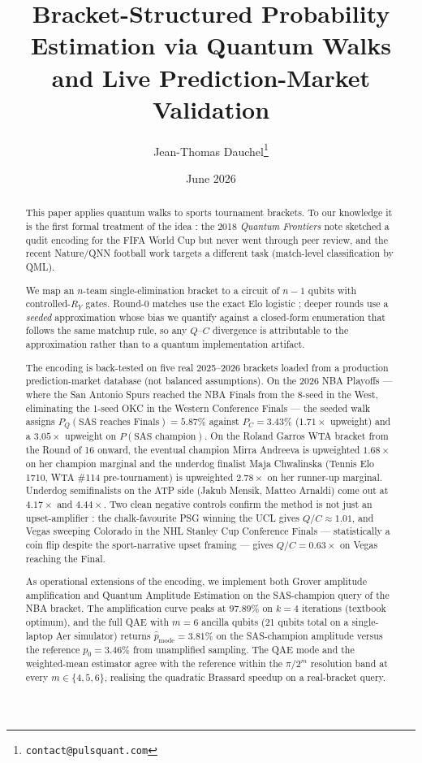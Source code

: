 \documentclass[11pt]{article}
\title{Bracket-Structured Probability Estimation via Quantum Walks\\
and Live Prediction-Market Validation}
\author{Jean-Thomas Dauchel\thanks{\texttt{contact@pulsquant.com}}}
\affil{PulsQuant --- Independent Research}
\date{June 2026}
\begin{document}
\maketitle

\begin{abstract}
This paper applies quantum walks to sports tournament brackets. To
our knowledge it is the first formal treatment of the idea : the 2018
\emph{Quantum Frontiers} note \cite{quantumfrontiers_wc_2018} sketched
a qudit encoding for the FIFA World Cup but never went through peer
review, and the recent Nature/QNN football work
\cite{nature_qnn_football_2025} targets a different task (match-level
classification by QML).

We map an $n$-team single-elimination bracket to a circuit of $n{-}1$
qubits with controlled-$R_Y$ gates. Round-0 matches use the exact
Elo logistic ; deeper rounds use a \emph{seeded} approximation whose
bias we quantify against a closed-form enumeration that follows the
same matchup rule, so any $Q$--$C$ divergence is attributable to the
approximation rather than to a quantum implementation artifact.

The encoding is back-tested on five real 2025--2026 brackets loaded
from a production prediction-market database (not balanced
assumptions). On the 2026 NBA Playoffs --- where the San Antonio
Spurs reached the NBA Finals from the 8-seed in the West, eliminating
the 1-seed OKC in the Western Conference Finals --- the seeded walk
assigns $P_Q(\text{SAS reaches Finals}) = 5.87\%$ against $P_C =
3.43\%$ ($\mathbf{1.71\times}$ upweight) and a $\mathbf{3.05\times}$
upweight on $P(\text{SAS champion})$. On the Roland Garros WTA bracket
from the Round of 16 onward, the eventual champion Mirra Andreeva is
upweighted $\mathbf{1.68\times}$ on her champion marginal and the
underdog finalist Maja Chwalinska (Tennis Elo 1710, WTA \#114
pre-tournament) is upweighted $\mathbf{2.78\times}$ on her
runner-up marginal. Underdog semifinalists on the ATP side (Jakub
Mensik, Matteo Arnaldi) come out at $\mathbf{4.17\times}$ and
$\mathbf{4.44\times}$. Two clean negative controls confirm the
method is not just an upset-amplifier : the chalk-favourite PSG
winning the UCL gives $Q/C \approx 1.01$, and Vegas sweeping Colorado
in the NHL Stanley Cup Conference Finals --- statistically a coin
flip despite the sport-narrative upset framing --- gives $Q/C =
0.63\times$ on Vegas reaching the Final.

As operational extensions of the encoding, we implement both Grover
amplitude amplification and Quantum Amplitude Estimation
\cite{brassard2002quantum} on the SAS-champion query of the NBA
bracket. The amplification curve peaks at $97.89\%$ on $k = 4$
iterations (textbook optimum), and the full QAE with $m = 6$ ancilla
qubits (21 qubits total on a single-laptop Aer simulator) returns
$\hat p_{\text{mode}} = 3.81\%$ on the SAS-champion amplitude versus
the reference $p_0 = 3.46\%$ from unamplified sampling. The QAE
mode and the weighted-mean estimator agree with the reference within
the $\pi / 2^m$ resolution band at every $m \in \{4, 5, 6\}$,
realising the quadratic Brassard speedup on a real-bracket query.


\end{abstract}
\end{document}
